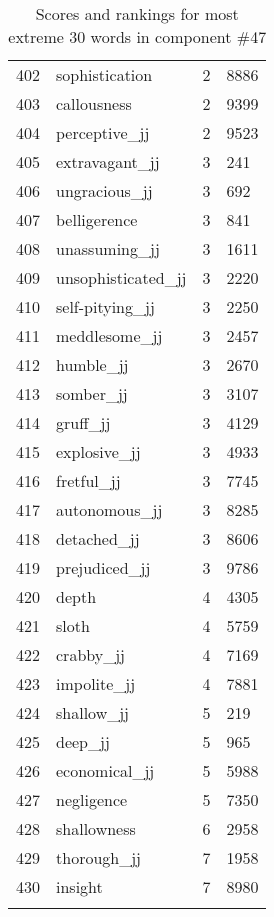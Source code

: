 \begin{longtable}[!htbp]{| rlr@{.}l |}
    402 & sophistication & 2 & 8886 \\
    403 & callousness & 2 & 9399 \\
    404 & perceptive\_jj & 2 & 9523 \\
    405 & extravagant\_jj & 3 & 241 \\
    406 & ungracious\_jj & 3 & 692 \\
    407 & belligerence & 3 & 841 \\
    408 & unassuming\_jj & 3 & 1611 \\
    409 & unsophisticated\_jj & 3 & 2220 \\
    410 & self-pitying\_jj & 3 & 2250 \\
    411 & meddlesome\_jj & 3 & 2457 \\
    412 & humble\_jj & 3 & 2670 \\
    413 & somber\_jj & 3 & 3107 \\
    414 & gruff\_jj & 3 & 4129 \\
    415 & explosive\_jj & 3 & 4933 \\
    416 & fretful\_jj & 3 & 7745 \\
    417 & autonomous\_jj & 3 & 8285 \\
    418 & detached\_jj & 3 & 8606 \\
    419 & prejudiced\_jj & 3 & 9786 \\
    420 & depth & 4 & 4305 \\
    421 & sloth & 4 & 5759 \\
    422 & crabby\_jj & 4 & 7169 \\
    423 & impolite\_jj & 4 & 7881 \\
    424 & shallow\_jj & 5 & 219 \\
    425 & deep\_jj & 5 & 965 \\
    426 & economical\_jj & 5 & 5988 \\
    427 & negligence & 5 & 7350 \\
    428 & shallowness & 6 & 2958 \\
    429 & thorough\_jj & 7 & 1958 \\
    430 & insight & 7 & 8980 \\
    \hline
    \caption{Scores and rankings for most extreme 30 words in component \#47} \\
\end{longtable}
